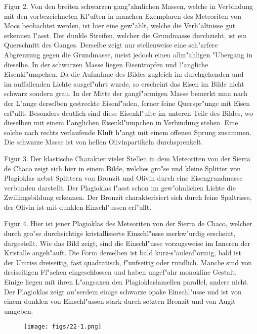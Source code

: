 \documentclass[a4paper, 11pt, oneside, polutonikogreek, german]{article}
\begin{document}
Figur 2. Von den breiten schwarzen gang"ahnlichen Massen, welche in Verbindung mit den vorbezeichneten Kl"uften in manchen Exemplaren des Meteoriten von Mocs beobachtet werden, ist hier eine gew"ahlt, welche die Verh"altnisse gut erkennen l"asst. Der dunkle Streifen, welcher die Grundmasse durchzieht, ist ein Querschnitt des Ganges. Derselbe zeigt nur stellenweise eine sch"arfere Abgrenzung gegen die Grundmasse, meist jedoch einen allm"ahligen "Ubergang in dieselbe. In der schwarzen Masse liegen Eisentropfen und l"angliche Eisenkl"umpchen. Da die Aufnahme des Bildes zugleich im durchgehenden und im auffallenden Lichte ausgef"uhrt wurde, so erscheint das Eisen im Bilde nicht schwarz sondern grau. In der Mitte der gangf"ormigen Masse bemerkt man nach der L"ange derselben gestreckte Eisenf"aden, ferner feine Querspr"unge mit Eisen erf"ullt. Besonders deutlich sind diese Eisenkl"ufte im unteren Teile des Bildes, wo dieselben mit einem l"anglichen Eisenkl"umpchen in Verbindung stehen. Eine solche nach rechts verlaufende Kluft h"angt mit einem offenen Sprung zusammen. Die schwarze Masse ist von hellen Olivinpartikeln durchsprenkelt.

Figur 3. Der klastische Charakter vieler Stellen in dem Meteoriten von der Sierra de Chaco zeigt sich hier in einem Bilde, welches gro"se und kleine Splitter von Plagioklas nebst Splittern von Bronzit und Olivin durch eine Eisengrundmasse verbunden darstellt. Der Plagioklas l"asst schon im gew"ohnlichen Lichte die Zwillingsbildung erkennen. Der Bronzit charakterisiert sich durch feine Spaltrisse, der Olivin ist mit dunklen Einschl"ussen erf"ullt.

Figur 4. Hier ist jener Plagioklas des Meteoriten von der Sierra de Chaco, welcher durch gro"se durchsichtige kristallisierte Einschl"usse merkw"urdig erscheint, dargestellt. Wie das Bild zeigt, sind die Einschl"usse vorzugsweise im Inneren der Kristalle angeh"auft. Die Form derselben ist bald kurz-s"aulenf"ormig, bald ist der Umriss dreiseitig, fast quadratisch, f"unfseitig oder rundlich. Manche sind von dreiseitigen Fl"achen eingeschlossen und haben ungef"ahr monokline Gestalt. Einige liegen mit ihren L"angsaxen den Plagioklaslamellen parallel, andere nicht. Der Plagioklas zeigt au"serdem einige schwarze opake Einschl"usse und ist von einem dunklen von Einschl"ussen stark durch setzten Bronzit und von Augit umgeben.
\clearpage

\vspace*{\fill}
\begin{figure}[H]
\centering
\texttt{[image: figs/22-1.png]}
\caption{}
\end{figure}
\vspace*{\fill}
\clearpage
\end{document}
